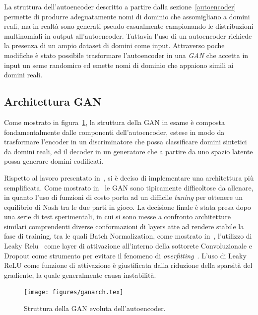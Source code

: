 La struttura dell'autoencoder descritto a partire dalla sezione~\ref{autoencoder} permette di produrre adeguatamente nomi di dominio che assomigliano a domini reali, ma in realtà sono generati pseudo-casualmente campionando le distribuzioni multinomiali in output all'autoencoder. Tuttavia l'uso di un autoencoder richiede la presenza di un ampio dataset di domini come input. Attraverso poche modifiche è stato possibile trasformare l'autoencoder in una \textit{GAN} che accetta in input un seme randomico ed emette nomi di dominio che appaiono simili ai domini reali.

\subsection{Architettura GAN}
\label{ganarch}
Come mostrato in figura~\ref{fig:archgan}, la struttura della GAN in esame è composta fondamentalmente dalle componenti dell'autoencoder, estese in modo da trasformare l'encoder in un discriminatore che possa classificare domini sintetici da domini reali, ed il decoder in un generatore che a partire da uno spazio latente possa generare domini codificati.

Rispetto al lavoro presentato in~\cite{deepdga}, si è deciso di implementare una architettura più semplificata. Come mostrato in~\cite{1606.03498} le GAN sono tipicamente difficoltose da allenare, in quanto l'uso di funzioni di costo porta ad un difficile \textit{tuning} per ottenere un equilibrio di Nash tra le due parti in gioco. La decisione finale è stata presa dopo una serie di test sperimentali, in cui si sono messe a confronto architetture similari comprendenti diverse conformazioni di layers atte ad rendere stabile la fase di training, tra le quali Batch Normalization, come mostrato in~\cite{1502.03167},  l'utilizzo di Leaky Relu~\cite{GANhacks} come layer di attivazione all'interno della sottorete Convoluzionale e Dropout come strumento per evitare il fenomeno di \textit{overfitting}~\cite{dropout}. L'uso di Leaky ReLU come funzione di attivazione è giustificata dalla riduzione della sparsità del gradiente, la quale generalmente causa instabilità.

\begin{figure}[!htb]
    \centering
	\texttt{[image: figures/ganarch.tex]}
	\caption{Struttura della GAN evoluta dell'autoencoder.
\label{fig:archgan}}
\end{figure}

